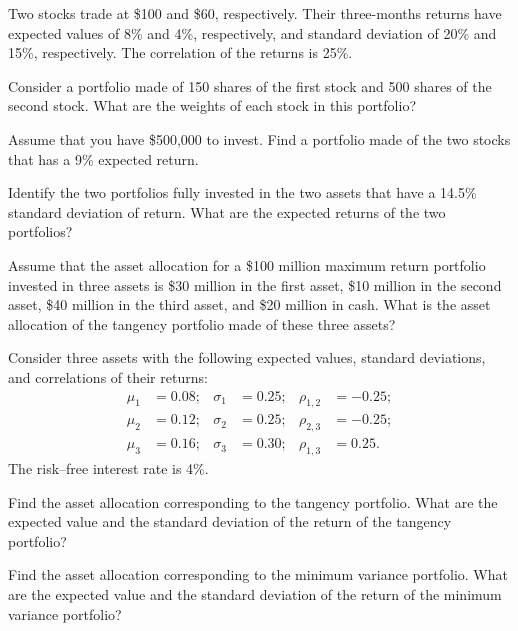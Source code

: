 \begin{exercises}

\item Two stocks trade at \$100 and \$60, respectively. Their three-months
returns have expected values of 8\% and 4\%, respectively, and standard
deviation of 20\% and 15\%, respectively. The correlation of the returns is
25\%.
\begin{subparts}
\item Consider a portfolio made of 150 shares of the first stock and 500
shares of the second stock. What are the weights of each stock in this
portfolio?
\item Assume that you have \$500,000 to invest. Find a portfolio made of the
two stocks that has a 9\% expected return.
\item Identify the two portfolios fully invested in the two assets that have
a 14.5\% standard deviation of return. What are the expected returns of the
two portfolios?
\end{subparts}

\item Assume that the asset allocation for a \$100 million maximum return
portfolio invested in three assets is \$30 million in the first asset, \$10
million in the second asset, \$40 million in the third asset, and \$20
million in cash. What is the asset allocation of the tangency portfolio made
of these three assets?

\item Consider three assets with the following expected values, standard
deviations, and correlations of their returns:
\[
\begin{aligned}
\mu_1 &= 0.08; & \sigma_1 &= 0.25; & \rho_{1,2} &= -0.25;\\
\mu_2 &= 0.12; & \sigma_2 &= 0.25; & \rho_{2,3} &= -0.25;\\
\mu_3 &= 0.16; & \sigma_3 &= 0.30; & \rho_{1,3} &= 0.25.
\end{aligned}
\]
The risk--free interest rate is 4\%.
\begin{subparts}
\item Find the asset allocation corresponding to the tangency portfolio.
What are the expected value and the standard deviation of the return of the
tangency portfolio?
\item Find the asset allocation corresponding to the minimum variance
portfolio. What are the expected value and the standard deviation of the
return of the minimum variance portfolio?
\end{subparts}


\end{exercises}

